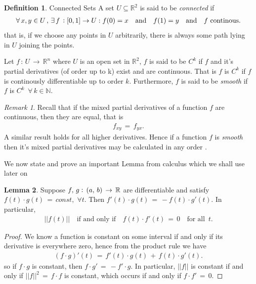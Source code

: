 \documentclass{UKZNcomp}
\theoremstyle{definition}
\newtheorem{definition}{Definition}[section]
\newtheorem{lemma}[definition]{Lemma}
\theoremstyle{remark}
\newtheorem*{remark}{Remark}
\begin{document}
\begin{definition}{Connected Sets}
A set $U\subseteq \mathbb{R}^{2}$ is said to be \textit{connected} if 
\begin{align*}
\forall \, x , y \in U \,,\, \exists \, f \, \vcentcolon [0,1] \to U : f(0) = x \quad \text{and}\quad f(1) = y \quad \text{and} \quad f \,\, \text{continous}.
\end{align*}
that is, if we choose any points in $U$ arbitrarily, there is always some path lying in $U$ joining the points.    
\end{definition}

Let $f\,:\,U \, \to \,  \mathbb{R}^{n}$ where $U$ is an open set in $\mathbb{R}^{2}$, $f$ is said to be $C^{k}$ if $f$ and it's partial derivatives (of order up to k) exist and are continuous. That is $f$ is $C^{k}$ if $f$ is continously differentiable up to order $k$. Furthermore, $f$ is said to be \textit{smooth} if $f$ is  $C^{k} \,\,\, \forall \, k \in \mathbb{N}$. 
\\
\begin{remark}
Recall that if the mixed partial derivatives of a function $f$ are continuous, then they are equal, that is 
\begin{align*}
f_{xy} \, = \, f_{yx}.
\end{align*}
A similar result holds for all higher derivatives. Hence if a function $f$ is \textit{smooth} then it's mixed partial derivatives may be calculated in any order \cite{Shifrin2016}.
\end{remark}

We now state and prove an important Lemma from calculus which we shall use later on

\begin{lemma}\label{lemma:calc}
Suppose $f,\,g\vcentcolon\,(a,\,b)\,\to\,\mathbb{R}$ are differentiable and satisfy $f(t)\cdot g(t)\,=\,const,\,\,\forall t$. Then $f'(t)\cdot g(t)\,=\,-f(t)\cdot g'(t)$. In particular,
\begin{align*}
\lvert\lvert f(t)\rvert\rvert\quad \text{if and only if}\quad  f(t)\cdot f'(t)\,=\,0\quad \text{for all}\,\,\, t.
\end{align*}
\end{lemma}

\begin{proof}
We know a function is constant on some interval if and only if its derivative is everywhere zero, hence from the product rule we have
\begin{align*}
(f\cdot g)'(t)\,=\,f'(t)\cdot g(t)\,+\,f(t)\cdot g'(t).
\end{align*}
so if $f\cdot g$ is constant, then $f\cdot g'\,=\,-f'\cdot g$. In particular, $\lvert \lvert f \rvert\rvert$ is constant if and only if $\lvert \lvert f \rvert\rvert^2\,=\,f\cdot f$ is constant, which occurs if and only if $f\cdot f'\,=\,0$.
\end{proof}
\end{document}
